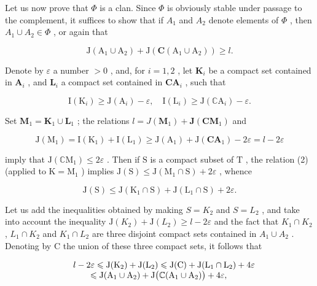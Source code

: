 Let us now prove that \(\Phi\) is a clan. Since \(\Phi\) is obviously stable under passage to the complement, it suffices to show that if \(A_{1}\) and \(A_{2}\) denote elements of \(\Phi\) , then \(A_{1} \cup A_{2} \in \Phi\) , or again that

\[
\mathrm{J} \left(\mathrm{A} _ {1} \cup \mathrm{A} _ {2}\right) + \mathrm{J} \left(\mathbf {C} \left(\mathrm{A} _ {1} \cup \mathrm{A} _ {2}\right)\right) \geqslant l.\tag{3}
\]

Denote by \(\varepsilon\) a number \(>0\) , and, for \(i = 1,2\) , let \(\mathbf{K}_i\) be a compact set contained in \(\mathbf{A}_i\) , and \(\mathbf{L}_i\) a compact set contained in \(\mathbf{C}\mathbf{A}_i\) , such that

\[
\mathrm{I} \left(\mathrm{K} _ {i}\right) \geqslant \mathrm{J} \left(\mathrm{A} _ {i}\right) - \varepsilon , \quad \mathrm{I} \left(\mathrm{L} _ {i}\right) \geqslant \mathrm{J} \left(\mathbb {C} \mathrm{A} _ {i}\right) - \varepsilon .
\]

Set \(\mathbf{M}_1 = \mathbf{K}_1\cup \mathbf{L}_1\) ; the relations \(l = J(\mathbf{M}_1) + \mathbf{J}(\mathbf{C}\mathbf{M}_1)\) and

\[
\mathrm{J} \left(\mathrm{M} _ {1}\right) = \mathrm{I} \left(\mathrm{K} _ {1}\right) + \mathrm{I} \left(\mathrm{L} _ {1}\right) \geqslant \mathrm{J} \left(\mathrm{A} _ {1}\right) + \mathrm{J} \left(\mathbf {C A} _ {1}\right) - 2 \varepsilon = l - 2 \varepsilon
\]

imply that \(\mathrm{J}(\mathbb{C}\mathrm{M}_1) \leqslant 2\varepsilon\) . Then if \(\mathrm{S}\) is a compact subset of \(\mathrm{T}\) , the relation (2) (applied to \(\mathrm{K} = \mathrm{M}_1\) ) implies \(\mathrm{J}(\mathrm{S}) \leqslant \mathrm{J}(\mathrm{M}_1 \cap \mathrm{S}) + 2\varepsilon\) , whence

\[
\mathrm{J} (\mathrm{S}) \leqslant \mathrm{J} (\mathrm{K} _ {1} \cap \mathrm{S}) + \mathrm{J} (\mathrm{L} _ {1} \cap \mathrm{S}) + 2 \varepsilon .
\]

Let us add the inequalities obtained by making \(S = K_{2}\) and \(S = L_{2}\) , and take into account the inequality \(\mathrm{J}(K_{2}) + \mathrm{J}(L_{2}) \geqslant l - 2\varepsilon\) and the fact that \(K_{1} \cap K_{2}\) , \(L_{1} \cap K_{2}\) and \(K_{1} \cap L_{2}\) are three disjoint compact sets contained in \(A_{1} \cup A_{2}\) . Denoting by C the union of these three compact sets, it follows that

\[
\begin{array}{r l} & {l - 2 \varepsilon \leqslant \mathrm{J} (\mathrm{K} _ {2}) + \mathrm{J} (\mathrm{L} _ {2}) \leqslant \mathrm{J} (\mathrm{C}) + \mathrm{J} (\mathrm{L} _ {1} \cap \mathrm{L} _ {2}) + 4 \varepsilon} \\ & {\qquad \leqslant \mathrm{J} (\mathrm{A} _ {1} \cup \mathrm{A} _ {2}) + \mathrm{J} \big (\mathbb {C} (\mathrm{A} _ {1} \cup \mathrm{A} _ {2}) \big) + 4 \varepsilon ,} \end{array}
\]

